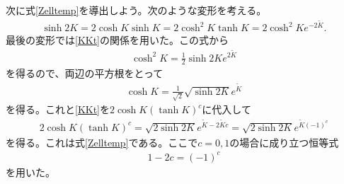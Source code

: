 \documentclass[a4paper,12pt,dvipdfmx]{jlreq}
\newcommand{\Kt}{\widetilde{K}}
\begin{document}
次に式\eqref{Zelltemp}を導出しよう。次のような変形を考える。
\begin{align}
  \sinh 2K = 2\cosh K \sinh K = 2 \cosh^2 K \tanh K =2\cosh^2 K e^{-2\Kt}.
\end{align}
最後の変形では\eqref{KKt}の関係を用いた。この式から
\begin{align}
  \cosh^2 K = \frac12 \sinh 2K e^{2\Kt}
\end{align}
を得るので、両辺の平方根をとって
\begin{align}
  \cosh K = \frac{1}{\sqrt{2}}\sqrt{\sinh 2K} e^{\Kt}
\end{align}
を得る。これと\eqref{KKt}を$2\cosh K (\tanh K)^c$に代入して
\begin{align}
  2\cosh K (\tanh K)^c
  =\sqrt{2\sinh 2K}e^{\Kt -2\Kt c}
  =\sqrt{2\sinh 2K}e^{\Kt (-1)^c}
\end{align}
を得る。これは式\eqref{Zelltemp}である。ここで$c=0,1$の場合に成り立つ恒等式
\begin{align}
  1-2c=(-1)^c
\end{align}
を用いた。
\printbibliography
\end{document}
